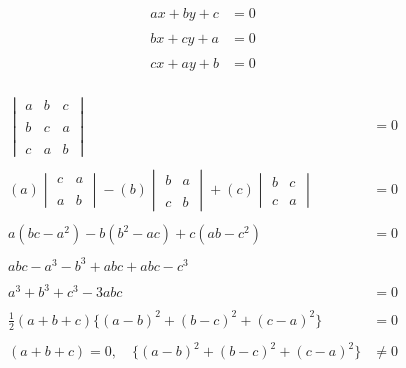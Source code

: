\documentclass{article}
\begin{document}
	\begin{align*}
	ax+by+c&=0\\
		\\
	bx+cy+a&=0\\
		\\
	cx+ay+b&=0
	\end{align*}
	\\ 
	\begin{align*}
		\begin{vmatrix}
			a& b&c\\
			\\
			b & c &a\\
			\\
			c& a &b
		\end{vmatrix}&=0\\
		\\
		(a)	\begin{vmatrix}
			c &a\\
			\\
			a &b
		\end{vmatrix}-(b)	\begin{vmatrix}
			b &a\\
			\\
			c &b
		\end{vmatrix}+(c)	\begin{vmatrix}
			b &c\\
			\\
			c &a
		\end{vmatrix}&=0\\
		\\
		a(bc-a^2)-b(b^2-ac)+c(ab-c^2)&=0\\
		\\
		abc-a^3-b^3+abc+abc-c^3\\
		\\
		a^3+b^3+c^3-3abc&=0\\
		\\
		\frac{1}{2}(a+b+c)\{(a-b)^2+(b-c)^2+(c-a)^2\}&=0\\
		\\
		(a+b+c)=0,\quad \{(a-b)^2+(b-c)^2+(c-a)^2\}&\ne 0
	\end{align*}
\end{document}
